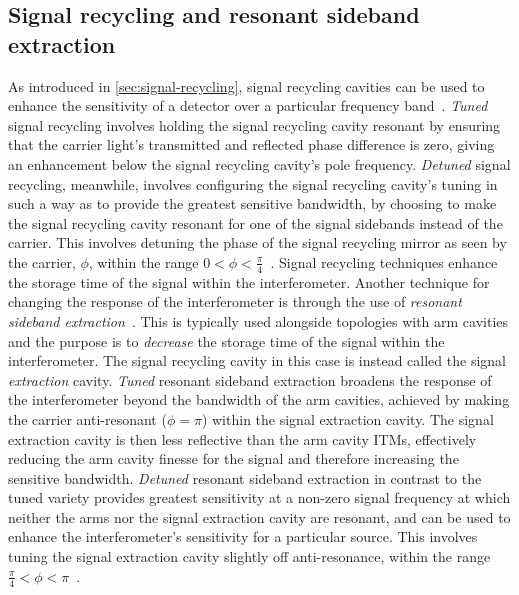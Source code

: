 \subsection{Signal recycling and resonant sideband extraction}
As introduced in \cref{sec:signal-recycling}, signal recycling cavities can be used to enhance the sensitivity of a detector over a particular frequency band~\cite{Hild2006}. \emph{Tuned} signal recycling involves holding the signal recycling cavity resonant by ensuring that the carrier light's transmitted and reflected phase difference is zero, giving an enhancement below the signal recycling cavity's pole frequency. \emph{Detuned} signal recycling, meanwhile, involves configuring the signal recycling cavity's tuning in such a way as to provide the greatest sensitive bandwidth, by choosing to make the signal recycling cavity resonant for one of the signal sidebands instead of the carrier. This involves detuning the phase of the signal recycling mirror as seen by the carrier, $\phi$, within the range $0 < \phi < \frac{\pi}{4}$~\cite{Somiya2005}. Signal recycling techniques enhance the storage time of the signal within the interferometer. Another technique for changing the response of the interferometer is through the use of \emph{resonant sideband extraction}~\cite{Mason2003}. This is typically used alongside topologies with arm cavities and the purpose is to \emph{decrease} the storage time of the signal within the interferometer. The signal recycling cavity in this case is instead called the signal \emph{extraction} cavity. \emph{Tuned} resonant sideband extraction broadens the response of the interferometer beyond the bandwidth of the arm cavities, achieved by making the carrier anti-resonant ($\phi = \pi$) within the signal extraction cavity. The signal extraction cavity is then less reflective than the arm cavity \glspl{ITM}, effectively reducing the arm cavity finesse for the signal and therefore increasing the sensitive bandwidth. \emph{Detuned} resonant sideband extraction in contrast to the tuned variety provides greatest sensitivity at a non-zero signal frequency at which neither the arms nor the signal extraction cavity are resonant, and can be used to enhance the interferometer's sensitivity for a particular source. This involves tuning the signal extraction cavity slightly off anti-resonance, within the range $\frac{\pi}{4} < \phi < \pi$~\cite{Somiya2005}.

